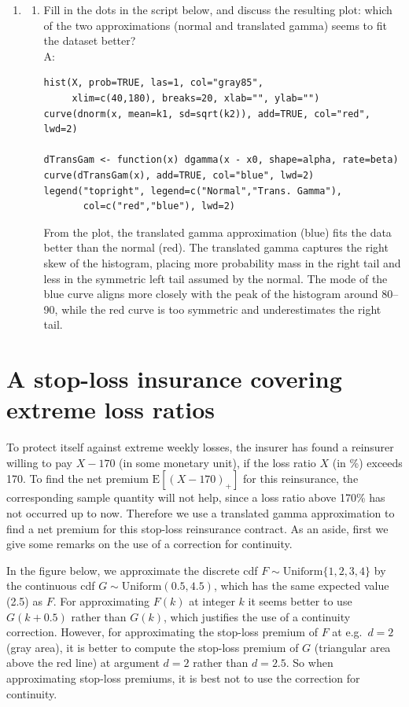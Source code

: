 \documentclass{article}
\begin{document}
\begin{enumerate}
  \item[$\boldsymbol{Q_5}$]
    \begin{enumerate}
      \item[] Fill in the dots in the script below, and discuss the resulting plot: which of the two approximations (normal and translated gamma) seems to fit the dataset better? \\A:

\begin{lstlisting}
hist(X, prob=TRUE, las=1, col="gray85",
     xlim=c(40,180), breaks=20, xlab="", ylab="")
curve(dnorm(x, mean=k1, sd=sqrt(k2)), add=TRUE, col="red",  lwd=2)

dTransGam <- function(x) dgamma(x - x0, shape=alpha, rate=beta)
curve(dTransGam(x), add=TRUE, col="blue", lwd=2)
legend("topright", legend=c("Normal","Trans. Gamma"),
       col=c("red","blue"), lwd=2)
\end{lstlisting}

      From the plot, the translated gamma approximation (blue) fits the data better than the normal (red). The translated gamma captures the right skew of the histogram, placing more probability mass in the right tail and less in the symmetric left tail assumed by the normal. The mode of the blue curve aligns more closely with the peak of the histogram around 80--90, while the red curve is too symmetric and underestimates the right tail.
    \end{enumerate}
\end{enumerate}

\newpage
\section{A stop-loss insurance covering extreme loss ratios}
To protect itself against extreme weekly losses, the insurer has found a reinsurer willing to pay $X - 170$ (in some monetary unit), if the loss ratio $X$ (in \%) exceeds 170. To find the net premium $\mathrm{E}[(X-170)_+]$ for this reinsurance, the corresponding sample quantity will not help, since a loss ratio above 170\% has not occurred up to now. Therefore we use a translated gamma approximation to find a net premium for this stop-loss reinsurance contract. As an aside, first we give some remarks on the use of a correction for continuity.

In the figure below, we approximate the discrete cdf $F \sim \mathrm{Uniform}\{1,2,3,4\}$ by the continuous cdf $G \sim \mathrm{Uniform}(0.5, 4.5)$, which has the same expected value (2.5) as $F$. For approximating $F(k)$ at integer $k$ it seems better to use $G(k+0.5)$ rather than $G(k)$, which justifies the use of a continuity correction. However, for approximating the stop-loss premium of $F$ at e.g.\ $d = 2$ (gray area), it is better to compute the stop-loss premium of $G$ (triangular area above the red line) at argument $d = 2$ rather than $d = 2.5$. So when approximating stop-loss premiums, it is best not to use the correction for continuity.
\end{document}
